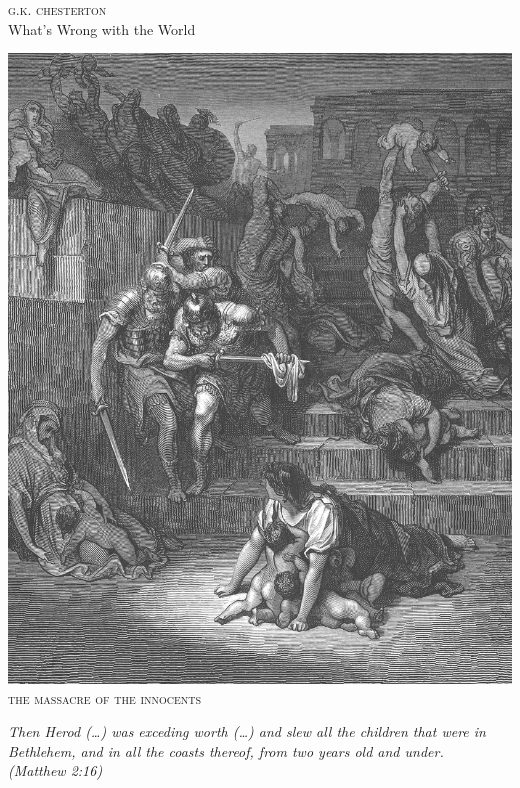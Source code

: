 \documentclass[final,10pt,letterpaper,twocolumn,openany]{book}
\begin{document}
\begin{titlepage}

	\begin{center}
		\Large \textsc{g.k. chesterton} \\[.5em]
		\huge {}\hspace{.2em} What's Wrong with the World \hspace{.2em}
	\end{center}
\begin{center}
		\includegraphics[width=.5\linewidth]{pics/E2C} \\[-.25em]
		\textsc{ the massacre of the innocents} \\[.5em]
		\begin{minipage}{.5\linewidth}\centering\small\itshape
			Then Herod (\ldots) was exceding worth (\ldots) and slew all the children that were in Bethlehem, and in all the coasts thereof, from two years old and under.\\ \normalfont
			(Matthew 2:16)
		\end{minipage}\vspace*{.25em}
			
\end{center}


\begin{multicols}{2}

\end{multicols}
\end{titlepage}
\end{document}
